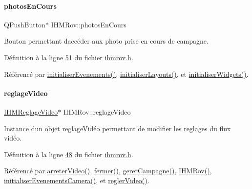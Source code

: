 \paragraph{\texorpdfstring{photos\+En\+Cours}{photosEnCours}}
{\footnotesize\ttfamily Q\+Push\+Button$\ast$ I\+H\+M\+Rov\+::photos\+En\+Cours\hspace{0.3cm}{\ttfamily [private]}}



Bouton permettant d\textquotesingle{}accéder aux photo prise en cours de campagne. 



Définition à la ligne \hyperlink{ihmrov_8h_source_l00051}{51} du fichier \hyperlink{ihmrov_8h_source}{ihmrov.\+h}.



Référencé par \hyperlink{ihmrov_8cpp_source_l00098}{initialiser\+Evenements()}, \hyperlink{ihmrov_8cpp_source_l00061}{initialiser\+Layouts()}, et \hyperlink{ihmrov_8cpp_source_l00033}{initialiser\+Widgets()}.

\mbox{\label{class_i_h_m_rov_a6baa53853d29151404e6ae3dec5d2003}} 
\paragraph{\texorpdfstring{reglage\+Video}{reglageVideo}}
{\footnotesize\ttfamily \hyperlink{class_i_h_m_reglage_video}{I\+H\+M\+Reglage\+Video}$\ast$ I\+H\+M\+Rov\+::reglage\+Video\hspace{0.3cm}{\ttfamily [private]}}



Instance d\textquotesingle{}un objet reglage\+Vidéo permettant de modifier les reglages du flux vidéo. 



Définition à la ligne \hyperlink{ihmrov_8h_source_l00048}{48} du fichier \hyperlink{ihmrov_8h_source}{ihmrov.\+h}.



Référencé par \hyperlink{ihmrov_8cpp_source_l00234}{arreter\+Video()}, \hyperlink{ihmrov_8cpp_source_l00253}{fermer()}, \hyperlink{ihmrov_8cpp_source_l00202}{gerer\+Campagne()}, \hyperlink{ihmrov_8cpp_source_l00015}{I\+H\+M\+Rov()}, \hyperlink{ihmrov_8cpp_source_l00229}{initialiser\+Evenements\+Camera()}, et \hyperlink{ihmrov_8cpp_source_l00161}{regler\+Video()}.

